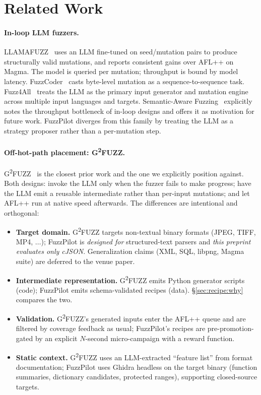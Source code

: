 \documentclass[11pt]{article}
\begin{document}
\section{Related Work}
\label{sec:related}

\paragraph{In-loop LLM fuzzers.}
LLAMAFUZZ~\cite{wang2024llamafuzz} uses an LLM fine-tuned on
seed/mutation pairs to produce structurally valid mutations, and
reports consistent gains over AFL++ on Magma. The model is queried
per mutation; throughput is bound by model latency.
FuzzCoder~\cite{liu2024fuzzcoder} casts byte-level mutation as a
sequence-to-sequence task. Fuzz4All~\cite{xia2024fuzz4all} treats
the LLM as the primary input generator and mutation engine across
multiple input languages and targets. Semantic-Aware
Fuzzing~\cite{semanticaware2025} explicitly notes the throughput
bottleneck of in-loop designs and offers it as motivation for future
work. FuzzPilot diverges from this family by treating the LLM as a
strategy proposer rather than a per-mutation step.

\paragraph{Off-hot-path placement: G\textsuperscript{2}FUZZ.}
G\textsuperscript{2}FUZZ~\cite{liu2025g2fuzz} is the closest prior
work and the one we explicitly position against. Both designs:
invoke the LLM only when the fuzzer fails to make progress; have
the LLM emit a reusable intermediate rather than per-input
mutations; and let AFL++ run at native speed afterwards. The
differences are intentional and orthogonal:

\begin{itemize}
  \item \textbf{Target domain.} G\textsuperscript{2}FUZZ targets
  non-textual binary formats (JPEG, TIFF, MP4, $\dots$);
  FuzzPilot is \emph{designed for} structured-text parsers and
  \emph{this preprint evaluates only cJSON}. Generalization claims
  (XML, SQL, libpng, Magma suite) are deferred to the venue paper.
  \item \textbf{Intermediate representation.}
  G\textsuperscript{2}FUZZ emits Python generator scripts (code);
  FuzzPilot emits schema-validated recipes (data).
  \S\ref{sec:recipe:why} compares the two.
  \item \textbf{Validation.} G\textsuperscript{2}FUZZ's generated
  inputs enter the AFL++ queue and are filtered by coverage
  feedback as usual; FuzzPilot's recipes are pre-promotion-gated by
  an explicit $N$-second micro-campaign with a reward function.
  \item \textbf{Static context.} G\textsuperscript{2}FUZZ uses an
  LLM-extracted ``feature list'' from format documentation;
  FuzzPilot uses Ghidra headless on the target binary (function
  summaries, dictionary candidates, protected ranges), supporting
  closed-source targets.
\end{itemize}
\end{document}
